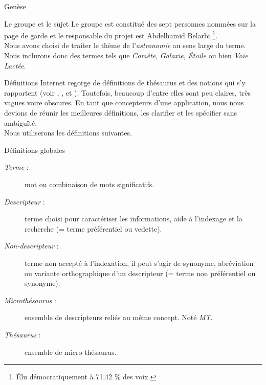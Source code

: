 \documentclass[a4paper, 12pt]{report}
\begin{document}
\begin{chapter}{Genèse}
	\begin{section}{Le groupe et le sujet}
		Le groupe est constitué des sept personnes nommées sur la page de garde et le responsable du projet est Abdelhamid Belarbi
		\footnote{Élu démocratiquement à 71,42 \% des voix.}.\\
		Nous avons choisi de traiter le thème de l’\emph{astronomie} au sens large du terme. Nous inclurons donc des termes tels que \emph{Comète},
		\emph{Galaxie}, \emph{Étoile} ou bien \emph{Voie Lactée}.
	\end{section}
	
	\begin{section}{Définitions}
	\label{aspic}
		Internet regorge de définitions de thésaurus et des notions qui s’y rapportent (voir \cite{Wikipedia}, \cite{Inpes}, \cite{Bdsp} et \cite{Unesco}).
		Toutefois, beaucoup d’entre elles sont peu claires, très vagues voire obscures. En tant que concepteurs d’une application, nous nous devions de réunir les
		meilleures définitions, les clarifier et les spécifier sans ambiguïté.\\
		
		
		
		\noindent
		Nous utiliserons les définitions suivantes.
		\begin{subsection}{Définitions globales}
			\begin{description}
				\item[\emph{Terme} :] mot ou combinaison de mots significatifs.
				\item[\emph{Descripteur} :] terme choisi pour caractériser les informations, aide à l'indexage et la recherche (= terme préférentiel ou vedette).
				\item[\emph{Non-descripteur} :] terme non accepté à l'indexation, il peut s'agir de synonyme, abréviation ou variante orthographique d'un descripteur
				(= terme non préférentiel ou
				synonyme).
				\item[\emph{Microthésaurus} :] ensemble de descripteurs reliés au même concept. Noté \emph{MT}.
				\item[\emph{Thésaurus} :] ensemble de micro-thésaurus.
			\end{description}
		\end{subsection}
		

\end{section}
\end{chapter}
\end{document}
